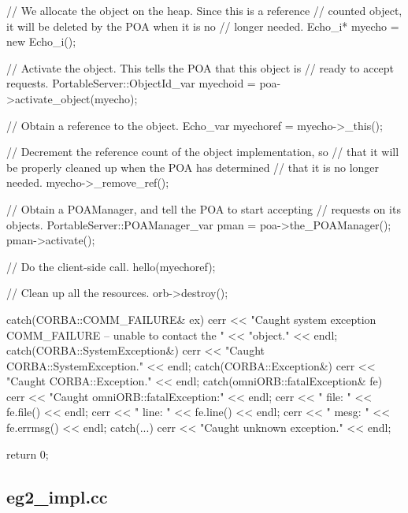 \documentclass[11pt,twoside,a4paper]{book}
\begin{document}
\begin{cxxlisting}
{{    // We allocate the object on the heap.  Since this is a reference
    // counted object, it will be deleted by the POA when it is no
    // longer needed.
    Echo_i* myecho = new Echo_i();

    // Activate the object.  This tells the POA that this object is
    // ready to accept requests.
    PortableServer::ObjectId_var myechoid = poa->activate_object(myecho);

    // Obtain a reference to the object.
    Echo_var myechoref = myecho->_this();

    // Decrement the reference count of the object implementation, so
    // that it will be properly cleaned up when the POA has determined
    // that it is no longer needed.
    myecho->_remove_ref();

    // Obtain a POAManager, and tell the POA to start accepting
    // requests on its objects.
    PortableServer::POAManager_var pman = poa->the_POAManager();
    pman->activate();

    // Do the client-side call.
    hello(myechoref);

    // Clean up all the resources.
    orb->destroy();
  }
  catch(CORBA::COMM_FAILURE& ex) {
    cerr << "Caught system exception COMM_FAILURE -- unable to contact the "
         << "object." << endl;
  }
  catch(CORBA::SystemException&) {
    cerr << "Caught CORBA::SystemException." << endl;
  }
  catch(CORBA::Exception&) {
    cerr << "Caught CORBA::Exception." << endl;
  }
  catch(omniORB::fatalException& fe) {
    cerr << "Caught omniORB::fatalException:" << endl;
    cerr << "  file: " << fe.file() << endl;
    cerr << "  line: " << fe.line() << endl;
    cerr << "  mesg: " << fe.errmsg() << endl;
  }
  catch(...) {
    cerr << "Caught unknown exception." << endl;
  }

  return 0;
}
\end{cxxlisting}


\clearpage
\subsection{eg2\_impl.cc}
\end{document}
